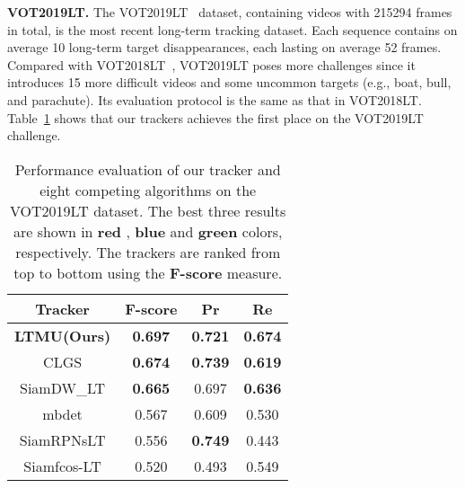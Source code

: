 \documentclass[10pt,twocolumn,letterpaper]{article}
\begin{document}
\noindent \textbf{VOT2019LT.} The VOT2019LT~\cite{VOT2019report} dataset, containing  videos
with 215294 frames in total, is the most recent long-term tracking dataset.
Each sequence contains on average 10 long-term target disappearances, each lasting on average 52 frames.
Compared with VOT2018LT~\cite{VOT2018report}, VOT2019LT poses more challenges since it introduces
15 more difficult videos and some uncommon targets (e.g., boat, bull, and parachute).
Its evaluation protocol is the same as that in VOT2018LT.
Table~\ref{tab:votlt19tab} shows that our trackers achieves the first place on the VOT2019LT challenge.
\vspace{-2mm}
\begin{table}[h]
\caption{Performance evaluation of our tracker and eight competing algorithms on the VOT2019LT dataset.
The best three results are shown in \textcolor[rgb]{1,0,0}{\textbf{red}}
, \textcolor[rgb]{0,0,1}{\textbf{blue}} and  \textcolor[rgb]{0,1,0}{\textbf{green}} colors, respectively.
The trackers are ranked from top to bottom using the \textbf{F-score} measure.}
\label{tab:votlt19tab}
\vspace{-2mm}
\small
\begin{center}
\begin{tabular}{cccc}
\hline
\textbf{Tracker} & \textbf{F-score}                      & \textbf{Pr}                           & \textbf{Re}                           \\ \hline
\textbf{LTMU(Ours)}
					   & {\color[HTML]{FE0000} \textbf{0.697}}
					   & {\color[HTML]{32CB00} \textbf{0.721}}
					   & {\color[HTML]{FE0000} \textbf{0.674}} \\
CLGS             & {\color[HTML]{3166FF} \textbf{0.674}} & {\color[HTML]{3166FF} \textbf{0.739}}
                       & {\color[HTML]{32CB00} \textbf{0.619}} \\
SiamDW\_LT       & {\color[HTML]{32CB00} \textbf{0.665}} & 0.697
                            & {\color[HTML]{3166FF} \textbf{0.636}} \\
mbdet               & 0.567                                 & 0.609                                 & 0.530                                 \\
SiamRPNsLT   & 0.556                                 & {\color[HTML]{FE0000} \textbf{0.749}} & 0.443                                 \\
Siamfcos-LT    & 0.520                                 & 0.493                                 & 0.549                                 \\

\end{tabular}
\end{center}
\end{table}
\end{document}
